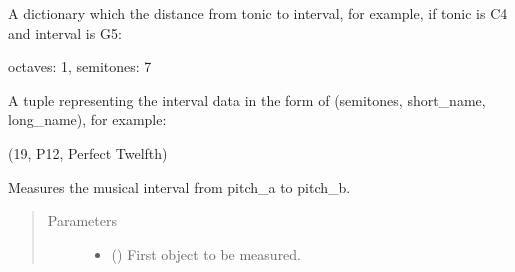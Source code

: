 \documentclass[letterpaper,10pt,english]{sphinxmanual}
\begin{document}
\begin{fulllineitems}
\begin{fulllineitems}
\end{fulllineitems}


\begin{fulllineitems}
\label{\detokenize{index:birdears.interval.Interval.distance}}
 \textendash{} A dictionary which the distance from tonic to
interval, for example, if tonic is C4 and interval is G5:

%
\begin{sphinxVerbatim}[commandchars=\\\{\}]
\PYGZob{}
    \PYGZsq{}octaves\PYGZsq{}: 1,
    \PYGZsq{}semitones\PYGZsq{}: 7
\PYGZcb{}
\end{sphinxVerbatim}

\end{fulllineitems}


\begin{fulllineitems}
\label{\detokenize{index:birdears.interval.Interval.data}}
 \textendash{} A tuple representing the interval data in the form of
(semitones, short\_name, long\_name), for example:

%
\begin{sphinxVerbatim}[commandchars=\\\{\}]
(19, \PYGZsq{}P12\PYGZsq{}, \PYGZsq{}Perfect Twelfth\PYGZsq{})
\end{sphinxVerbatim}

\end{fulllineitems}


\begin{fulllineitems}
\label{\detokenize{index:birdears.interval.Interval.__init__}}
Measures the musical interval from pitch\_a to pitch\_b.
\begin{quote}\begin{description}
\item[{Parameters}] \leavevmode\begin{itemize}
\item {} 
 () \textendash{} First  object to be measured.


\end{itemize}
\end{description}
\end{quote}
\end{fulllineitems}
\end{fulllineitems}
\end{document}
